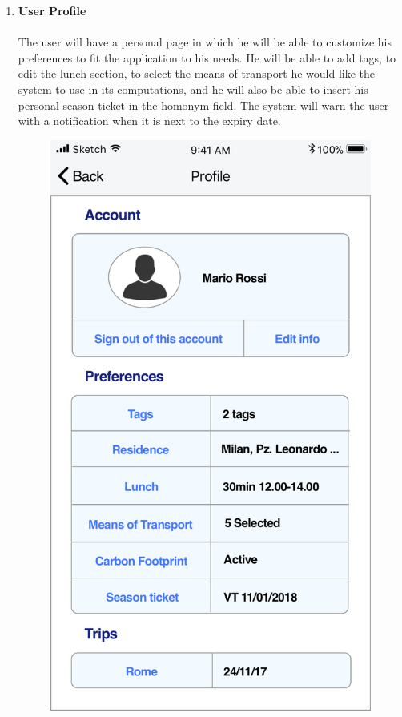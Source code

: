 \begin{enumerate}
	\item \textbf{User Profile}\\
			\vspace{0cm}\\
			The user will have a personal page in which he will be able to customize his preferences to fit the application to his needs. He will be able to add tags, to edit the lunch section, to select the means of transport he would like the system to use in its computations, and he will also be able to insert his personal season ticket in the homonym field. 
			The system will warn the user with a notification when it is next to the expiry date. 
			\begin{figure}[H]
				\centering
				\includegraphics[scale=0.25]{Images/Sketch/User_Profile}

\end{figure}
\end{enumerate}
